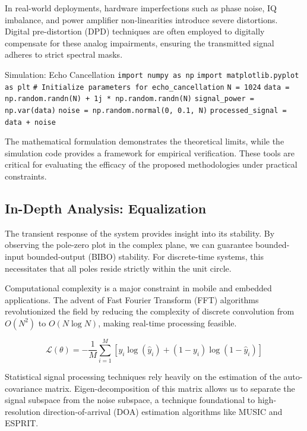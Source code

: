 In real-world deployments, hardware imperfections such as phase noise, IQ imbalance, and power amplifier non-linearities introduce severe distortions. Digital pre-distortion (DPD) techniques are often employed to digitally compensate for these analog impairments, ensuring the transmitted signal adheres to strict spectral masks.

\begin{pythonbox}{Simulation: Echo Cancellation}
\texttt{import numpy as np}
\texttt{import matplotlib.pyplot as plt}
\texttt{}
\texttt{\# Initialize parameters for echo\_cancellation}
\texttt{N = 1024}
\texttt{data = np.random.randn(N) + 1j * np.random.randn(N)}
\texttt{signal\_power = np.var(data)}
\texttt{noise = np.random.normal(0, 0.1, N)}
\texttt{processed\_signal = data + noise}
\end{pythonbox}

\vspace{0.5cm}
The mathematical formulation demonstrates the theoretical limits, while the simulation code provides a framework for empirical verification. These tools are critical for evaluating the efficacy of the proposed methodologies under practical constraints.


\subsection{In-Depth Analysis: Equalization}
The transient response of the system provides insight into its stability. By observing the pole-zero plot in the complex plane, we can guarantee bounded-input bounded-output (BIBO) stability. For discrete-time systems, this necessitates that all poles reside strictly within the unit circle.

Computational complexity is a major constraint in mobile and embedded applications. The advent of Fast Fourier Transform (FFT) algorithms revolutionized the field by reducing the complexity of discrete convolution from $O(N^2)$ to $O(N \log N)$, making real-time processing feasible.

\begin{equation}
    \mathcal{L}(\theta) = -\frac{1}{M} \sum_{i=1}^{M} \left[ y_i \log(\hat{y}_i) + (1-y_i)\log(1-\hat{y}_i) \right]
\end{equation}

Statistical signal processing techniques rely heavily on the estimation of the auto-covariance matrix. Eigen-decomposition of this matrix allows us to separate the signal subspace from the noise subspace, a technique foundational to high-resolution direction-of-arrival (DOA) estimation algorithms like MUSIC and ESPRIT.


